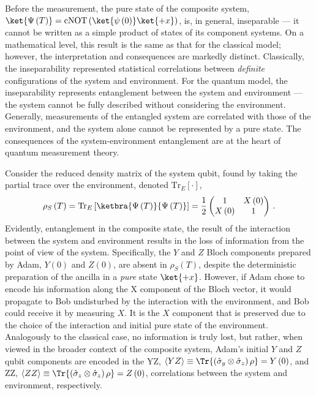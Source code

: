 Before the measurement, the pure state of the composite system, $\ket{\Psi\left(T\right)}=\mathrm{cNOT}\left(\ket{\psi\left(0\right)}\ket{+x}\right)$,
is, in general, inseparable — it cannot be written as a simple product
of states of its component systems. On a mathematical level, this
result is the same as that for the classical model; however, the interpretation
and consequences are markedly distinct. Classically, the inseparability
represented statistical correlations between \emph{definite} configurations
of the system and environment. For the quantum model, the inseparability
represents entanglement between the system and environment — the system
cannot be fully described without considering the environment. Generally,
measurements of the entangled system are correlated with those of
the environment, and the system alone cannot be represented by a pure
state. The consequences of the system-environment entanglement are
at the heart of quantum measurement theory. 

Consider the reduced density matrix of the system qubit, found by
taking the partial trace over the environment, denoted $\mathrm{Tr}_{E}\left[\cdot\right]$,
\begin{equation}
\rho_{S}\left(T\right)=\mathrm{Tr}_{E}\left[\ketbra{\Psi\left(T\right)}{\Psi\left(T\right)}\right]=\frac{1}{2}\begin{pmatrix}1 & X\left(0\right)\\
X\left(0\right) & 1
\end{pmatrix}\,.\label{eq:rho_s-env-q}
\end{equation}
Evidently, entanglement in the composite state, the result of the
interaction between the system and environment results in the loss
of information from the point of view of the system. Specifically,
the $Y$ and $Z$ Bloch components prepared by Adam, $Y\left(0\right)$
and $Z\left(0\right)$, are absent in $\rho_{S}\left(T\right)$, despite
the deterministic preparation of the ancilla in a\emph{ pure} state
$\ket{+x}$. However, if Adam chose to encode his information along
the X component of the Bloch vector, it would propagate to Bob undisturbed
by the interaction with the environment, and Bob could receive it
by measuring $X$. It is the $X$ component that is preserved due
to the choice of the interaction and initial pure state of the environment.
Analogously to the classical case, no information is truly lost, but
rather, when viewed in the broader context of the composite system,
Adam's initial $Y$ and $Z$ qubit components are encoded in the YZ,
$\left\langle YZ\right\rangle \equiv\Tr{\left(\hat{\sigma}_{y}\otimes\hat{\sigma}_{z}\right)\rho}=Y\left(0\right)$,
and ZZ, $\left\langle ZZ\right\rangle \equiv\Tr{\left(\hat{\sigma}_{z}\otimes\hat{\sigma}_{z}\right)\rho}=Z\left(0\right)$,
correlations between the system and environment, respectively.


